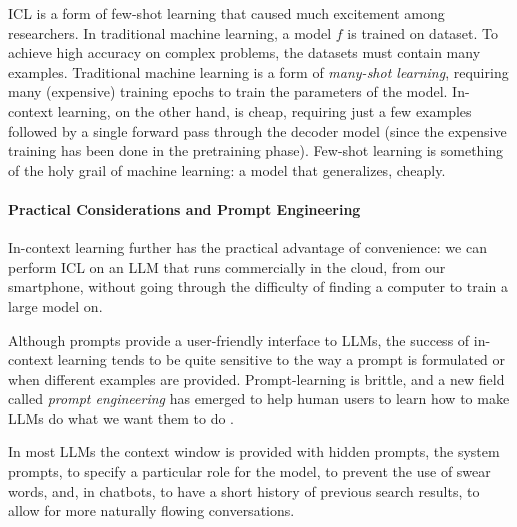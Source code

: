 ICL is a form of few-shot learning that caused much excitement among researchers. 
In traditional machine learning, a model $f$ is trained on  dataset.
To achieve high accuracy on complex problems, the datasets must contain many examples. Traditional  machine learning is a form of {\em many-shot learning}, requiring many (expensive) training epochs to train the parameters of the model.
In-context learning, on the other hand, is cheap, requiring just a few examples followed by a single forward pass through the decoder model (since the expensive training has been done in the pretraining phase). Few-shot learning is something of the holy grail of machine learning:  a model that generalizes, cheaply. 




\paragraph{Practical Considerations and Prompt Engineering}
In-context learning further  has the practical advantage of convenience: we can perform ICL on an LLM that runs commercially in the cloud, from our smartphone, without going through the difficulty of finding a computer to train a large model on. 


Although  prompts provide a user-friendly interface to LLMs, the success of in-context learning tends to be quite sensitive to the way a prompt is formulated or when different  examples are provided. Prompt-learning is brittle, and a
new field called {\em prompt engineering} has emerged to 
help human users to learn how to
make LLMs do what we want them to do \citep{radford2019language,wei2022emergent,giray2023prompt,sahoo2024systematic}.


In most LLMs the context window is  provided with hidden prompts, the system prompts, to specify a particular role for the model,  to prevent the use of swear words, and, in chatbots, to have a short history of previous search results, to allow for more naturally flowing conversations. 


